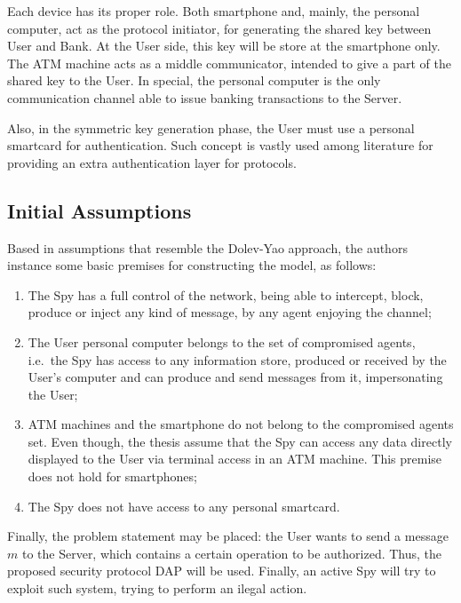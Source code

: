 Each device has its proper role. Both smartphone and, mainly, the personal computer, act as the protocol initiator, for generating the shared key between User and Bank. At the User side, this key will be store at the smartphone only. The ATM machine acts as a middle communicator, intended to give a part of the shared key to the User. In special, the personal computer is the only communication channel able to issue banking transactions to the Server.

Also, in the symmetric key generation phase, the User must use a personal smartcard for authentication. Such concept is vastly used among literature \cite{smartcard:shoup-robin} for providing an extra authentication layer for protocols.






\subsection{Initial Assumptions}
Based in assumptions that resemble the Dolev-Yao approach, the authors instance some basic premises for constructing the model, as follows:

\begin{enumerate}
  \item The Spy has a full control of the network, being able to intercept, block, produce or inject any kind of message, by any agent enjoying the channel;

  \item The User personal computer belongs to the set of compromised agents, i.e.\ the Spy has access to any information store, produced or received by the User's computer and can produce and send messages from it, impersonating the User;

  \item ATM machines and the smartphone do not belong to the compromised agents set. Even though, the thesis assume that the Spy can access any data directly displayed to the User via terminal access in an ATM machine. This premise does not hold for smartphones;

  \item The Spy does not have access to any personal smartcard.
\end{enumerate}

Finally, the problem statement may be placed: the User wants to send a message $m$ to the Server, which contains a certain operation to be authorized. Thus, the proposed security protocol DAP will be used. Finally, an active Spy will try to exploit such system, trying to perform an ilegal action.






